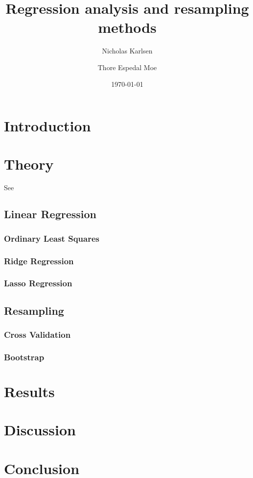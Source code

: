 \documentclass[reprint, english, nofootinbib]{revtex4-2}
\begin{document}
\title{Regression analysis and resampling methods}
\author{Nicholas Karlsen}
\author{Thore Espedal Moe}
\date{\today}

\begin{abstract}
    \blindtext %
\end{abstract}

\maketitle

\section{Introduction}
    \blindtext

\section{Theory}
    See \textcite{hastie}
    \subsection{Linear Regression}
        \subsubsection{Ordinary Least Squares}
        \subsubsection{Ridge Regression}
        \subsubsection{Lasso Regression}
    \subsection{Resampling}
        \subsubsection{Cross Validation}
        \subsubsection{Bootstrap}
\section{Results}
    \blindtext

\section{Discussion}
    \blindtext

\section{Conclusion}
    \blindtext

\onecolumngrid

\newpage
\twocolumngrid
\appendix
\end{document}
